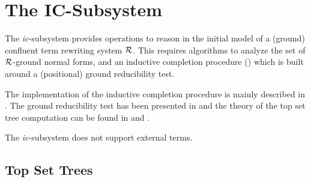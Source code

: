 \section{The IC-Subsystem} \label{se:ic}

The {\it ic}-subsystem provides operations to reason in the initial model of
a (ground) confluent term rewriting system $\cal R$.
This requires algorithms to analyze the set of $\cal R$-ground normal forms,
and an inductive completion procedure (\cite{Kuechlin:89}) which is built
around a (positional) ground reducibility test.

The implementation of the inductive completion procedure is mainly
described in \cite{Buendgen:87}.
The ground reducibility test has been presented in 
\cite{BuendgenKuechlin:89} and
the theory of the top set tree computation can be found in
\cite[Chap.\ 4.1]{Buendgen:91b} and \cite{BuendgenEckhardt:92}.

The {\it ic}-subsystem does not support external terms.

\subsection{Top Set Trees}

